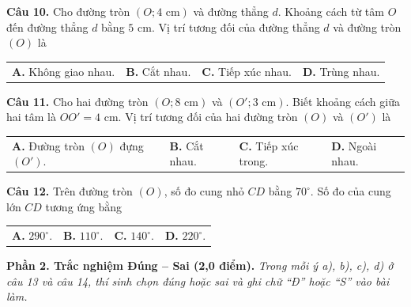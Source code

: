 \documentclass[11pt,a4paper]{article}
\begin{document}
\vspace{1.5mm}
\textbf{Câu 10.} Cho đường tròn $(O; 4\text{ cm})$ và đường thẳng $d$. Khoảng cách từ tâm $O$ đến đường thẳng $d$ bằng $5\text{ cm}$. Vị trí tương đối của đường thẳng $d$ và đường tròn $(O)$ là\\
\begin{tabularx}{\linewidth}{XXXX}
\textbf{A.} Không giao nhau. & \textbf{B.} Cắt nhau. & \textbf{C.} Tiếp xúc nhau. & \textbf{D.} Trùng nhau.
\end{tabularx}

\vspace{1.5mm}
\textbf{Câu 11.} Cho hai đường tròn $(O; 8\text{ cm})$ và $(O'; 3\text{ cm})$. Biết khoảng cách giữa hai tâm là $OO' = 4\text{ cm}$. Vị trí tương đối của hai đường tròn $(O)$ và $(O')$ là\\
\begin{tabularx}{\linewidth}{XXXX}
\textbf{A.} Đường tròn $(O)$ đựng $(O')$. & \textbf{B.} Cắt nhau. & \textbf{C.} Tiếp xúc trong. & \textbf{D.} Ngoài nhau.
\end{tabularx}

\vspace{1.5mm}
\textbf{Câu 12.} Trên đường tròn $(O)$, số đo cung nhỏ $CD$ bằng $70^\circ$. Số đo của cung lớn $CD$ tương ứng bằng\\
\begin{tabularx}{\linewidth}{XXXX}
\textbf{A.} $290^\circ$. & \textbf{B.} $110^\circ$. & \textbf{C.} $140^\circ$. & \textbf{D.} $220^\circ$.
\end{tabularx}

\vspace{3mm}
\noindent
\textbf{Phần 2. Trắc nghiệm Đúng -- Sai (2,0 điểm).} \textit{Trong mỗi ý a), b), c), d) ở câu 13 và câu 14, thí sinh chọn đúng hoặc sai và ghi chữ ``Đ'' hoặc ``S'' vào bài làm.}
\end{document}
